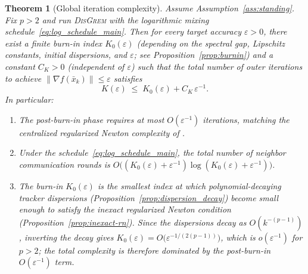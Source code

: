 \documentclass[11pt,a4paper]{article}
\def\cO{O}%
\newtheorem{theorem}{Theorem}[section]
\newcommand{\cO}{\mathcal{O}}
\begin{document}
\begin{theorem}[Global iteration complexity]\label{thm:main}
Assume Assumption~\ref{ass:standing}.
Fix $p>2$ and run \textsc{DisGrem} with the logarithmic mixing schedule~\eqref{eq:log_schedule_main}.
Then for every target accuracy $\varepsilon>0$, there exist a finite burn-in index $K_0(\varepsilon)$
(depending on the spectral gap, Lipschitz constants, initial dispersions, and $\varepsilon$;
see Proposition~\ref{prop:burnin})
and a constant $C_K>0$ (independent of $\varepsilon$) such that the total number of
outer iterations to achieve $\|\nabla f(\bar x_k)\|\le \varepsilon$ satisfies
\[
K(\varepsilon)\;\le\; K_0(\varepsilon) + C_K\,\varepsilon^{-1}.
\]
In particular:
\begin{enumerate}[leftmargin=1.2em,itemsep=2pt]
\item The post-burn-in phase requires at most $\cO(\varepsilon^{-1})$ iterations,
matching the centralized regularized Newton complexity of \citet{mishchenko2023rn}.
\item Under the schedule~\eqref{eq:log_schedule_main}, the total number of neighbor communication rounds is
$\cO\big((K_0(\varepsilon)+\varepsilon^{-1})\log(K_0(\varepsilon)+\varepsilon^{-1})\big)$.
\item The burn-in $K_0(\varepsilon)$ is the smallest index at which
polynomial-decaying tracker dispersions
(Proposition~\ref{prop:dispersion_decay}) become small enough to satisfy the
inexact regularized Newton condition (Proposition~\ref{prop:inexact-rn}).
Since the dispersions decay as $\cO(k^{-(p-1)})$, inverting the decay gives
$K_0(\varepsilon)=\cO\!\bigl(\varepsilon^{-1/(2(p-1))}\bigr)$,
which is $o(\varepsilon^{-1})$ for $p>2$; the total complexity is therefore
dominated by the post-burn-in $\cO(\varepsilon^{-1})$ term.
\end{enumerate}
\end{theorem}
\end{document}
